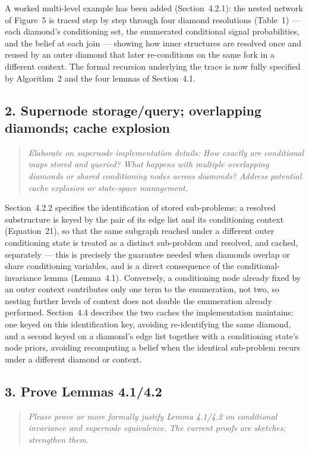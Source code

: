 \documentclass[11pt]{article}
\newenvironment{revcomment}
  {\begin{quote}\itshape\color{gray!60!black}}
  {\end{quote}}
\begin{document}
A worked multi-level example has been added (Section~4.2.1): the nested network of Figure~5 is traced step by step through four diamond resolutions (Table~1) --- each diamond's conditioning set, the enumerated conditional signal probabilities, and the belief at each join --- showing how inner structures are resolved once and reused by an outer diamond that later re-conditions on the same fork in a different context. The formal recursion underlying the trace is now fully specified by Algorithm~2 and the four lemmas of Section~4.1.

\subsection*{2. Supernode storage/query; overlapping diamonds; cache explosion}
\begin{revcomment}
Elaborate on supernode implementation details: How exactly are conditional maps stored and queried? What happens with multiple overlapping diamonds or shared conditioning nodes across diamonds? Address potential cache explosion or state-space management.
\end{revcomment}

Section~4.2.2 specifies the identification of stored sub-problems: a resolved substructure is keyed by the pair of its edge list and its conditioning context (Equation~21), so that the same subgraph reached under a different outer conditioning state is treated as a distinct sub-problem and resolved, and cached, separately --- this is precisely the guarantee needed when diamonds overlap or share conditioning variables, and is a direct consequence of the conditional-invariance lemma (Lemma~4.1). Conversely, a conditioning node already fixed by an outer context contributes only one term to the enumeration, not two, so nesting further levels of context does not double the enumeration already performed. Section~4.4 describes the two caches the implementation maintains: one keyed on this identification key, avoiding re-identifying the same diamond, and a second keyed on a diamond's edge list together with a conditioning state's node priors, avoiding recomputing a belief when the identical sub-problem recurs under a different diamond or context.

\subsection*{3. Prove Lemmas 4.1/4.2}
\begin{revcomment}
Please prove or more formally justify Lemma 4.1/4.2 on conditional invariance and supernode equivalence. The current proofs are sketches; strengthen them.
\end{revcomment}
\end{document}
